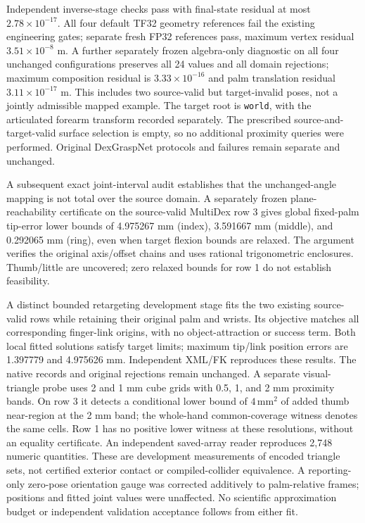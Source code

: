 \documentclass[10pt,letterpaper]{article}
\begin{document}
Independent inverse-stage checks pass with final-state residual at most
$2.78\times10^{-17}$. All four default TF32 geometry references fail the existing
engineering gates; separate fresh FP32 references pass, maximum vertex residual
$3.51\times10^{-8}$ m. A further separately frozen algebra-only diagnostic on all
four unchanged configurations preserves all 24 values and all domain rejections;
maximum composition residual is $3.33\times10^{-16}$ and palm translation
residual $3.11\times10^{-17}$ m. This includes two source-valid but target-invalid
poses, not a jointly admissible mapped example. The target root is \texttt{world},
with the articulated forearm transform recorded separately. The prescribed
source-and-target-valid surface selection is empty, so no additional proximity
queries were performed. Original DexGraspNet protocols and failures remain
separate and unchanged.

A subsequent exact joint-interval audit establishes that the unchanged-angle
mapping is not total over the source domain. A separately frozen plane-reachability
certificate on the source-valid MultiDex row 3 gives global fixed-palm tip-error
lower bounds of 4.975267 mm (index), 3.591667 mm (middle), and 0.292065 mm (ring),
even when target flexion bounds are relaxed. The argument verifies the original
axis/offset chains and uses rational trigonometric enclosures. Thumb/little are
uncovered; zero relaxed bounds for row 1 do not establish feasibility.

A distinct bounded retargeting development stage fits the two existing
source-valid rows while retaining their original palm and wrists. Its objective
matches all corresponding finger-link origins, with no object-attraction or
success term. Both local fitted solutions satisfy target limits; maximum tip/link
position errors are 1.397779 and 4.975626 mm. Independent XML/FK reproduces these
results. The native records and original rejections remain unchanged. A separate
visual-triangle probe uses 2 and 1 mm cube grids with 0.5, 1, and 2 mm proximity
bands. On row 3 it detects a conditional lower bound of $4\,\mathrm{mm}^2$ of added
thumb near-region at the 2 mm band; the whole-hand common-coverage witness denotes
the same cells. Row 1 has no positive lower witness at these resolutions, without
an equality certificate. An independent saved-array reader reproduces 2,748
numeric quantities. These are development measurements of encoded triangle sets,
not certified exterior contact or compiled-collider equivalence. A reporting-only
zero-pose orientation gauge was corrected additively to palm-relative frames;
positions and fitted joint values were unaffected. No scientific approximation
budget or independent validation acceptance follows from either fit.
\end{document}
